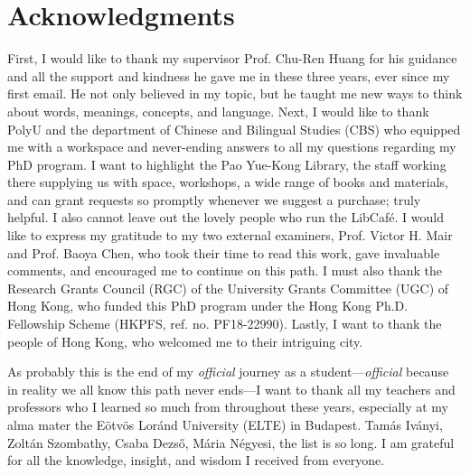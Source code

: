 \chapter*{Acknowledgments}
\label{ch:acknowledgments}


First, I would like to thank my supervisor Prof. Chu-Ren Huang for his guidance and all the support and kindness he gave me in these three years, ever since my first email. He not only believed in my topic, but he taught me new ways to think about words, meanings, concepts, and language. Next, I would like to thank PolyU and the department of Chinese and Bilingual Studies (CBS) who equipped me with a workspace and never-ending answers to all my questions regarding my PhD program. I want to highlight the Pao Yue-Kong Library, the staff working there supplying us with space, workshops, a wide range of books and materials, and can grant requests so promptly whenever we suggest a purchase; truly helpful. I also cannot leave out the lovely people who run the LibCafé. I would like to express my gratitude to my two external examiners, Prof. Victor H. Mair and Prof. Baoya Chen, who took their time to read this work, gave invaluable comments, and encouraged me to continue on this path. I must also thank the Research Grants Council (RGC) of the University Grants Committee (UGC) of Hong Kong, who funded this PhD program under the Hong Kong Ph.D. Fellowship Scheme (HKPFS, ref. no. PF18-22990). Lastly, I want to thank the people of Hong Kong, who welcomed me to their intriguing city.

As probably this is the end of my \textit{official} journey as a student---\textit{official} because in reality we all know this path never ends---I want to thank all my teachers and professors who I learned so much from throughout these years, especially at my alma mater the Eötvös Loránd University (ELTE) in Budapest. Tamás Iványi, Zoltán Szombathy, Csaba Dezső, Mária Négyesi, the list is so long. I am grateful for all the knowledge, insight, and wisdom I received from everyone.

